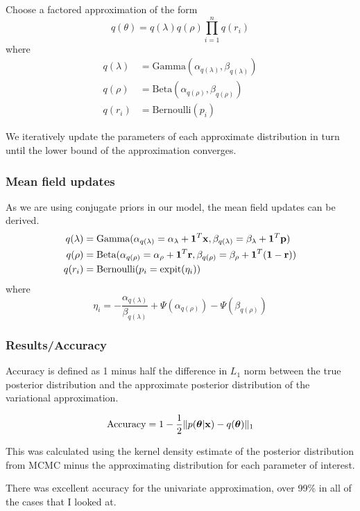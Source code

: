 \documentclass{beamer}
\begin{document}
\begin{frame}
Choose a factored approximation of the form
$$
q(\theta) = q(\lambda) q(\rho) \prod_{i=1}^n q(r_i)
$$
where
\begin{align*}
q(\lambda) &= \text{Gamma}(\alpha_{q(\lambda)}, \beta_{q(\lambda)}) \\
q(\rho) &= \text{Beta}(\alpha_{q(\rho)}, \beta_{q(\rho)}) \\
q(r_i) &= \text{Bernoulli}(p_i)
\end{align*}


We iteratively update the parameters of each approximate distribution
in turn until the lower bound of the approximation converges.

\end{frame}
 

\begin{frame}
\frametitle{Mean field updates}
As we are using conjugate priors in our model, the mean field updates can be derived.
\begin{align*}
q(\lambda) &= \text{Gamma}(\alpha_{q(\lambda)} = \alpha_\lambda + {\bf 1}^T {\bf x}, \beta_{q(\lambda)} = \beta_\lambda + {\bf 1}^T{\bf p}) \\
q(\rho) &= \text{Beta}(\alpha_{q(\rho)} = \alpha_\rho + {\bf 1}^T{\bf r}, \beta_{q(\rho)} = \beta_\rho + {\bf 1}^T({\bf 1} - {\bf r})) \\
q(r_i) &= \text{Bernoulli}(p_i = \text{expit}(\eta_i))
\end{align*}
where
$$
\eta_i = - \frac{\alpha_{q(\lambda)}}{\beta_{q(\lambda)}} + \Psi(\alpha_{q(\rho)}) - \Psi(\beta_{q(\rho)})
$$

\end{frame}

\begin{frame}
\frametitle{Results/Accuracy}
Accuracy is defined as 1 minus half the difference in $L_1$ norm between the
true posterior distribution and the approximate posterior distribution of the
variational approximation.

$$
\text{Accuracy} = 1 - {\frac{1}{2}} \|p({\boldsymbol \theta}|{\bf x}) - q({\boldsymbol \theta})\|_1
$$

This was calculated using the kernel density estimate of the posterior
distribution from MCMC minus the approximating distribution for each parameter of
interest.

\bigskip 
There was excellent accuracy for the univariate approximation, over 99\% in all of the cases that I looked at.
\end{frame}
\end{document}
